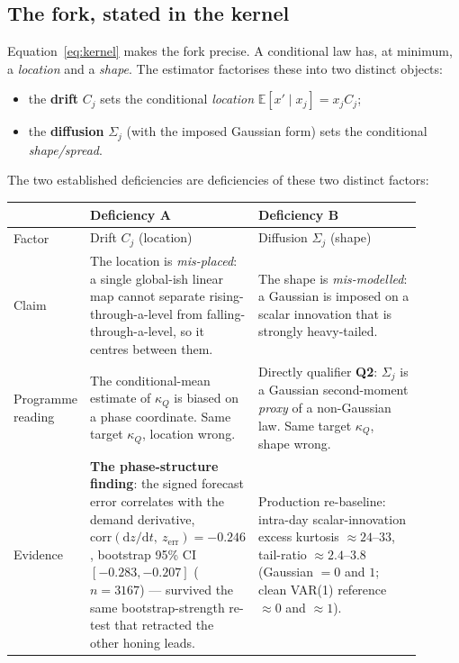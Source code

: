 \documentclass[11pt]{article}
\newcommand{\kQ}{\kappa_{Q}}
\newcommand{\E}{\mathbb{E}}
\newcommand{\defA}{\textsf{A}}
\newcommand{\defB}{\textsf{B}}
\begin{document}
\subsection{The fork, stated in the kernel}
\label{sec:fork}

Equation~\eqref{eq:kernel} makes the fork precise. A conditional law has,
at minimum, a \emph{location} and a \emph{shape}. The estimator
factorises these into two distinct objects:
\begin{itemize}[leftmargin=2em]
  \item the \textbf{drift} $C_j$ sets the conditional \emph{location}
        $\E[x' \mid x_j] = x_j C_j$;
  \item the \textbf{diffusion} $\Sigma_j$ (with the imposed Gaussian
        form) sets the conditional \emph{shape/spread}.
\end{itemize}
The two established deficiencies are deficiencies of these two distinct
factors:

\begin{center}
\begin{tabular}{@{}p{0.10\linewidth}p{0.40\linewidth}p{0.40\linewidth}@{}}
\toprule
 & \textbf{Deficiency \defA} & \textbf{Deficiency \defB}\\
\midrule
Factor & Drift $C_j$ (location) & Diffusion $\Sigma_j$ (shape) \\[3pt]
Claim  & The location is \emph{mis-placed}: a single global-ish
         linear map cannot separate rising-through-a-level from
         falling-through-a-level, so it centres between them.
       & The shape is \emph{mis-modelled}: a Gaussian is imposed on a
         scalar innovation that is strongly heavy-tailed. \\[3pt]
Programme reading
       & The conditional-mean estimate of $\kQ$ is biased on a
         phase coordinate. Same target $\kQ$, location wrong.
       & Directly qualifier \textbf{Q2}: $\Sigma_j$ is a Gaussian
         second-moment \emph{proxy} of a non-Gaussian law. Same target
         $\kQ$, shape wrong. \\[3pt]
Evidence
       & \textbf{The phase-structure finding}: the signed forecast
         error correlates with the demand derivative,
         $\mathrm{corr}(\mathrm{d}z/\mathrm{d}t,\ z_{\mathrm{err}})
         = -0.246$, bootstrap 95\% CI $[-0.283,-0.207]$
         ($n=3167$) --- survived the same bootstrap-strength
         re-test that retracted the other honing leads.
       & Production re-baseline: intra-day scalar-innovation excess
         kurtosis ${\approx}24\text{--}33$, tail-ratio
         ${\approx}2.4\text{--}3.8$ (Gaussian $=0$ and $1$; clean
         VAR(1) reference ${\approx}0$ and ${\approx}1$). \\
\bottomrule
\end{tabular}
\end{center}
\end{document}
